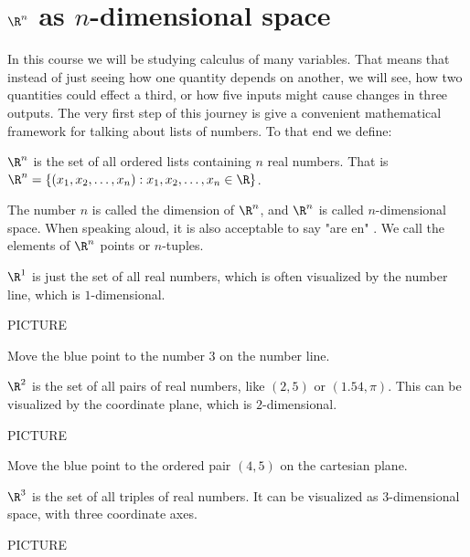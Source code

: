 
\section{$\R^n$ as $n$-dimensional space}

In this course we will be studying calculus of many variables.  That means that instead of just seeing how one quantity depends on another, we will see,
how two quantities could effect a third, or how five inputs might cause changes in three outputs.  The very first step of this journey is give a convenient mathematical 
framework for talking about lists of numbers.  To that end we define:

\begin{definition}
  $\R^n$ is the set of all ordered lists containing $n$ real numbers.  That is $\R^n = \{ (x_1,x_2,\dots, x_n) : x_1,x_2,\dots, x_n \in \R \}$.
\end{definition}

The number $n$ is called the dimension of $\R^n$, and $\R^n$ is called $n$-dimensional space.  When speaking aloud, it is also acceptable to say "are en" .
 We call the elements of $\R^n$ points or $n$-tuples.

\begin{example}
	$\R^1$ is just the set of all real numbers, which is often visualized by the number line, which is $1$-dimensional.
	
	PICTURE
\end{example}

\begin{question}
Move the blue point to the number $3$ on the number line.
\end{question}


\begin{example}
	$\R^2$ is the set of all pairs of real numbers, like $(2,5)$ or $(1.54,\pi)$. This can be visualized by the coordinate plane, which is $2$-dimensional.
	
	PICTURE
	
\end{example}

\begin{question}
Move the blue point to the ordered pair $(4,5)$ on the cartesian plane.
\end{question}

\begin{example}
	$\R^3$ is the set of all triples of real numbers.  It can be visualized as $3$-dimensional space, with three coordinate axes. 
	
	PICTURE
\end{example}

